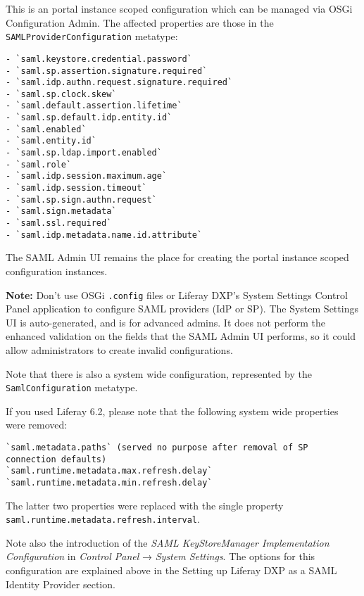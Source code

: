 This is an portal instance scoped configuration which can be managed via
OSGi Configuration Admin. The affected properties are those in the
\texttt{SAMLProviderConfiguration} metatype:

\begin{verbatim}
- `saml.keystore.credential.password`
- `saml.sp.assertion.signature.required`
- `saml.idp.authn.request.signature.required`
- `saml.sp.clock.skew`
- `saml.default.assertion.lifetime`
- `saml.sp.default.idp.entity.id`
- `saml.enabled`
- `saml.entity.id`
- `saml.sp.ldap.import.enabled`
- `saml.role`
- `saml.idp.session.maximum.age`
- `saml.idp.session.timeout`
- `saml.sp.sign.authn.request`
- `saml.sign.metadata`
- `saml.ssl.required`
- `saml.idp.metadata.name.id.attribute`
\end{verbatim}

The SAML Admin UI remains the place for creating the portal instance
scoped configuration instances.

\noindent\hrulefill

\textbf{Note:} Don't use OSGi \texttt{.config} files or Liferay DXP's
System Settings Control Panel application to configure SAML providers
(IdP or SP). The System Settings UI is auto-generated, and is for
advanced admins. It does not perform the enhanced validation on the
fields that the SAML Admin UI performs, so it could allow administrators
to create invalid configurations.

\noindent\hrulefill

Note that there is also a system wide configuration, represented by the
\texttt{SamlConfiguration} metatype.

If you used Liferay 6.2, please note that the following system wide
properties were removed:

\begin{verbatim}
`saml.metadata.paths` (served no purpose after removal of SP connection defaults)
`saml.runtime.metadata.max.refresh.delay`
`saml.runtime.metadata.min.refresh.delay`
\end{verbatim}

The latter two properties were replaced with the single property
\texttt{saml.runtime.metadata.refresh.interval}.

Note also the introduction of the \emph{SAML KeyStoreManager
Implementation Configuration} in \emph{Control Panel} → \emph{System
Settings}. The options for this configuration are explained above in the
Setting up Liferay DXP as a SAML Identity Provider section.

